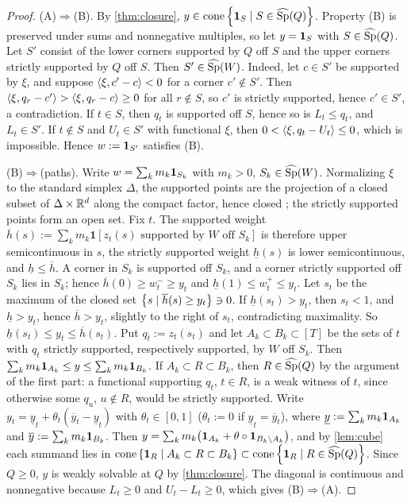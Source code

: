 \begin{proof}
(A)$\Rightarrow$(B). By \cref{thm:closure}, $y\in\operatorname{cone}\left\{ \mathbf 1_{S}\mid S\in\widehat{\operatorname{Sp}}(Q) \right\}$. Property (B) is preserved under sums and nonnegative multiples, so let $y=\mathbf 1_{S}$ with $S\in\widehat{\operatorname{Sp}}(Q)$. Let $S'$ consist of the lower corners supported by $Q$ off $S$ and the upper corners strictly supported by $Q$ off $S$. Then $S'\in\widehat{\operatorname{Sp}}(W)$. Indeed, let $c\in S'$ be supported by $\xi$, and suppose $\langle \xi, c'-c\rangle<0$ for a corner $c'\notin S'$. Then $\langle \xi, q_r-c'\rangle>\langle \xi, q_r-c\rangle\ge0$ for all $r\notin S$, so $c'$ is strictly supported, hence $c'\in S'$, a contradiction. If $t\in S$, then $q_t$ is supported off $S$, hence so is $L_t\le q_t$, and $L_t\in S'$. If $t\notin S$ and $U_t\in S'$ with functional $\xi$, then $0<\langle \xi, q_t-U_t\rangle\le0$, which is impossible. Hence $w:=\mathbf 1_{S'}$ satisfies (B).

(B)$\Rightarrow$(paths). Write $w=\sum_km_k\mathbf 1_{S_k}$ with $m_k>0$, $S_k\in\widehat{\operatorname{Sp}}(W)$. Normalizing $\xi$ to the standard simplex $\Delta$, the supported points are the projection of a closed subset of $\Delta\times\mathbb{R}^d$ along the compact factor, hence closed \citep[Lemma~26.8]{Munkres2000}; the strictly supported points form an open set. Fix $t$. The supported weight $\overline h(s):=\sum_km_k\mathbf 1[z_t(s)\text{ supported by }W\text{ off }S_k]$ is therefore upper semicontinuous in $s$, the strictly supported weight $\underline h(s)$ is lower semicontinuous, and $\underline h\le\overline h$. A corner in $S_k$ is supported off $S_k$, and a corner strictly supported off $S_k$ lies in $S_k$; hence $\overline h(0)\ge w^-_t\ge y_t$ and $\underline h(1)\le w^+_t\le y_t$. Let $s_t$ be the maximum of the closed set $\left\{ s\mid\overline h(s)\ge y_t \right\}\ni0$. If $\underline h(s_t)>y_t$, then $s_t<1$, and $\underline h>y_t$, hence $\overline h>y_t$, slightly to the right of $s_t$, contradicting maximality. So $\underline h(s_t)\le y_t\le\overline h(s_t)$. Put $q_t:=z_t(s_t)$ and let $A_k\subset B_k\subset[T]$ be the sets of $t$ with $q_t$ strictly supported, respectively supported, by $W$ off $S_k$. Then $\sum_km_k\mathbf 1_{A_k}\le y\le\sum_km_k\mathbf 1_{B_k}$. If $A_k\subset R\subset B_k$, then $R\in\widehat{\operatorname{Sp}}(Q)$ by the argument of the first part: a functional supporting $q_t$, $t\in R$, is a weak witness of $t$, since otherwise some $q_u$, $u\notin R$, would be strictly supported. Write $y_t=\underline y_t+\theta_t(\overline y_t-\underline y_t)$ with $\theta_t\in[0,1]$ ($\theta_t:=0$ if $\underline y_t=\overline y_t$), where $\underline y:=\sum_km_k\mathbf 1_{A_k}$ and $\overline y:=\sum_km_k\mathbf 1_{B_k}$. Then $y=\sum_km_k\bigl(\mathbf 1_{A_k}+\theta\circ\mathbf 1_{B_k\setminus A_k}\bigr)$, and by \cref{lem:cube} each summand lies in $\operatorname{cone}\left\{ \mathbf 1_{R}\mid A_k\subset R\subset B_k \right\}\subset\operatorname{cone}\left\{ \mathbf 1_{R}\mid R\in\widehat{\operatorname{Sp}}(Q) \right\}$. Since $Q\ge0$, $y$ is weakly solvable at $Q$ by \cref{thm:closure}. The diagonal is continuous and nonnegative because $L_t\ge0$ and $U_t-L_t\ge0$, which gives (B)$\Rightarrow$(A).
\end{proof}

